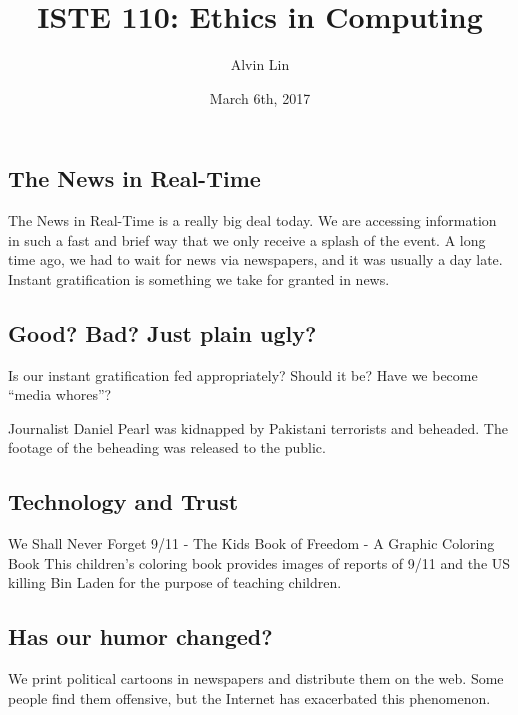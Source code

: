 \documentclass[letterpaper, 12pt]{article}
\title{ISTE 110: Ethics in Computing}
\author{Alvin Lin}
\date{March 6th, 2017}
\begin{document}
\maketitle

\subsection*{The News in Real-Time}
The News in Real-Time is a really big deal today. We are accessing information
in such a fast and brief way that we only receive a splash of the event.
A long time ago, we had to wait for news via newspapers, and it was usually
a day late. Instant gratification is something we take for granted in news.

\subsection*{Good? Bad? Just plain ugly?}
Is our instant gratification fed appropriately? Should it be? Have we become
``media whores''? \par
Journalist Daniel Pearl was kidnapped by Pakistani terrorists and beheaded. The
footage of the beheading was released to the public.

\subsection*{Technology and Trust}
We Shall Never Forget 9/11 - The Kids Book of Freedom - A Graphic Coloring Book
This children's coloring book provides images of reports of 9/11 and the US
killing Bin Laden for the purpose of teaching children.

\subsection*{Has our humor changed?}
We print political cartoons in newspapers and distribute them on the web. Some
people find them offensive, but the Internet has exacerbated this phenomenon.
\end{document}
